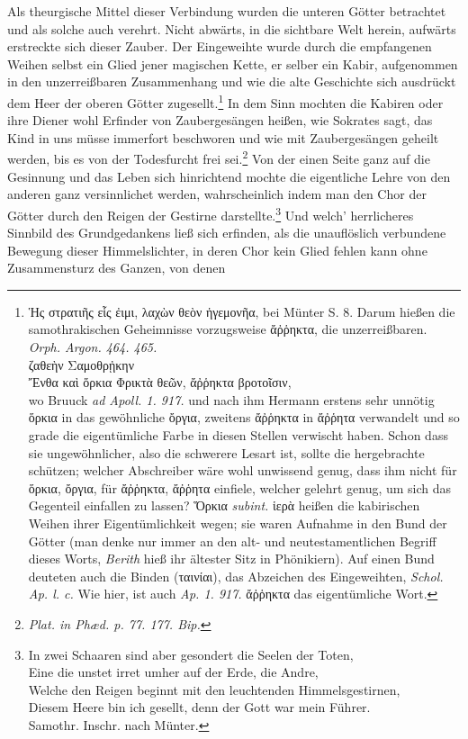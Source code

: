 \documentclass[a4paper, 11pt, oneside]{article}
\begin{document}
Als theurgische Mittel dieser Verbindung wurden die unteren Götter betrachtet und als solche auch verehrt. Nicht abwärts, in die sichtbare Welt herein, aufwärts erstreckte sich dieser Zauber. Der Eingeweihte wurde durch die empfangenen Weihen selbst ein Glied jener magischen Kette, er selber ein Kabir, aufgenommen in den unzerreißbaren Zusammenhang und wie die alte Geschichte sich ausdrückt dem Heer der oberen Götter zugesellt.\footnote{Ἡς στρατιῆς εἷς ἐιμι, λαχὼν θεὸν ἡγεμονῆα, bei Münter S. 8. Darum hießen die samothrakischen Geheimnisse vorzugsweise ἄῤῥηκτα, die unzerreißbaren. \emph{Orph. Argon. 464. 465.}\\\hspace*{15mm}ζαθεὴν Σαμοθρᾐκην\\\hspace*{5mm}Ἔνθα καὶ ὅρκια Φρικτὰ θεῶν, ἄῤῥηκτα βροτοῖσιν,\\\hspace*{5mm}wo Bruuck \emph{ad Apoll. 1. 917.} und nach ihm Hermann erstens sehr unnötig ὅρκια in das gewöhnliche ὄργια, zweitens ἄῤῥηκτα in ἄῤῥητα verwandelt und so grade die eigentümliche Farbe in diesen Stellen verwischt haben. Schon dass sie ungewöhnlicher, also die schwerere Lesart ist, sollte die hergebrachte schützen; welcher Abschreiber wäre wohl unwissend genug, dass ihm nicht für ὅρκια, ὄργια, für ἄῤῥηκτα, ἄῤῥητα einfiele, welcher gelehrt genug, um sich das Gegenteil einfallen zu lassen? Ὅρκια \emph{subint.} ἱερὰ heißen die kabirischen Weihen ihrer Eigentümlichkeit wegen; sie waren Aufnahme in den Bund der Götter (man denke nur immer an den alt- und neutestamentlichen Begriff dieses Worts, \emph{Berith} hieß ihr ältester Sitz in Phönikiern). Auf einen Bund deuteten auch die Binden (ταινίαι), das Abzeichen des Eingeweihten, \emph{Schol. Ap. l. c.} Wie hier, ist auch \emph{Ap. 1. 917.} ἄῤῥηκτα das eigentümliche Wort.} In dem Sinn mochten die Kabiren oder ihre Diener wohl Erfinder von Zaubergesängen heißen, wie Sokrates sagt, das Kind in uns müsse immerfort beschworen und wie mit Zaubergesängen geheilt werden, bis es von der Todesfurcht frei sei.\footnote{\emph{Plat. in Phæd. p. 77. 177. Bip.}} Von der einen Seite ganz auf die Gesinnung und das Leben sich hinrichtend mochte die eigentliche Lehre von den anderen ganz versinnlichet werden, wahrscheinlich indem man den Chor der Götter durch den Reigen der Gestirne darstellte.\footnote{In zwei Schaaren sind aber gesondert die Seelen der Toten,\\\hspace*{5mm}Eine die unstet irret umher auf der Erde, die Andre,\\\hspace*{5mm}Welche den Reigen beginnt mit den leuchtenden Himmelsgestirnen,\\\hspace*{5mm}Diesem Heere bin ich gesellt, denn der Gott war mein Führer.\\\hspace*{15mm}Samothr. Inschr. nach Münter.} Und welch' herrlicheres Sinnbild des Grundgedankens ließ sich erfinden, als die unauflöslich verbundene Bewegung dieser Himmelslichter, in deren Chor kein Glied fehlen kann ohne Zusammensturz des Ganzen, von denen 
\end{document}
